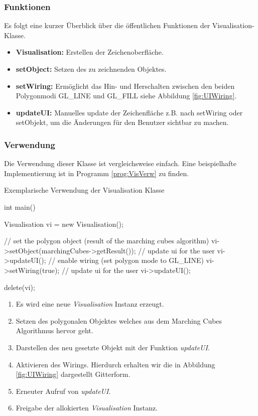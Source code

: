 \subsubsection{Funktionen}
Es folgt eine kurzer Überblick über die öffentlichen Funktionen der Visualisation-Klasse.\\
\begin{itemize}
	\item \textbf{Visualisation:} Erstellen der Zeichenoberfläche.
	\item \textbf{setObject:} Setzen des zu zeichnenden Objektes.
	\item \textbf{setWiring:} Ermöglicht das Hin- und Herschalten zwischen den beiden Polygonmodi GL\_LINE und GL\_FILL siehe Abbildung \ref{fig:UIWiring}.
	\item \textbf{updateUI:} Manuelles update der Zeichenfläche z.B. nach setWiring oder setObjekt, um die Änderungen für den Benutzer sichtbar zu machen.
\end{itemize}
\subsubsection{Verwendung}
Die Verwendung dieser Klasse ist vergleichsweise einfach. Eine beispielhafte Implementierung ist in Programm \ref{prog:VisVerw} zu finden. 
\begin{program}[H]
	\caption{Exemplarische Verwendung der Visualisation Klasse}
	\label{prog:VisVerw}
	\begin{CCode}
		int main(){
			Visualisation vi = new Visualisation();		
			
			// set the polygon object (result of the marching cubes algorithm)
			vi->setObject(marchingCubes->getResult());
			// update ui for the user
			vi->updateUI();		
			// enable wiring (set polygon mode to GL\_LINE)
			vi->setWiring(true);
			// update ui for the user
			vi->updateUI();			
			
			delete(vi);
		} 
	\end{CCode}
\end{program}
\begin{enumerate}
	\item Es wird eine neue \textit{Visualisation} Instanz erzeugt.
	\item Setzen des polygonalen Objektes welches aus dem Marching Cubes Algorithmus hervor geht.
	\item Darstellen des neu gesetzte Objekt mit der Funktion \textit{updateUI}.
	\item Aktivieren des Wirings. Hierdurch erhalten wir die in Abbildung \ref{fig:UIWiring} dargestellt Gitterform.
	\item Erneuter Aufruf von \textit{updateUI}.
	\item Freigabe der allokierten \textit{Visualisation} Instanz.
\end{enumerate}
